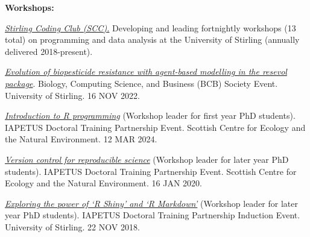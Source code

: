 \documentclass[letterpaper]{article}
\renewenvironment{itemize}{
  \begin{list}{}{
    \setlength{\leftmargin}{1.5em}
  }
}{
  \end{list}
}
\begin{document}
\begin{itemize}
\item {\bf Workshops:}
\begin{itemize}
\item[$\bullet$]{{\it \href{https://stirlingcodingclub.github.io/studyGroup}{Stirling Coding Club (SCC).}} Developing and leading fortnightly workshops (13 total) on programming and data analysis at the University of Stirling (annually delivered 2018-present).}
\item[$\bullet$]{{\it \href{http://bradduthie.github.io/talks/BCB_talk.pdf}{Evolution of biopesticide resistance with agent-based modelling in the resevol package}}. Biology, Computing Science, and Business (BCB) Society Event. University of Stirling. 16 NOV 2022.}
\item[$\bullet$]{{\it \href{http://bradduthie.github.io/notes/R_intro_notes.html}{Introduction to R programming}} (Workshop leader for first year PhD students). IAPETUS Doctoral Training Partnership Event. Scottish Centre for Ecology and the Natural Environment. 12 MAR 2024.}
\item[$\bullet$]{{\it \href{https://bradduthie.github.io/version_control/vc_notes.html}{Version control for reproducible science}} (Workshop leader for later year PhD students). IAPETUS Doctoral Training Partnership Event. Scottish Centre for Ecology and the Natural Environment. 16 JAN 2020.}
\item[$\bullet$]{{\it \href{https://bradduthie.github.io/blog/Manuscripts-in-Rmarkdown/}{Exploring the power of `R Shiny' and `R Markdown'}} (Workshop leader for later year PhD students). IAPETUS Doctoral Training Partnership Induction Event. University of Stirling. 22 NOV 2018.}
\end{itemize}

\end{itemize}
\end{document}
